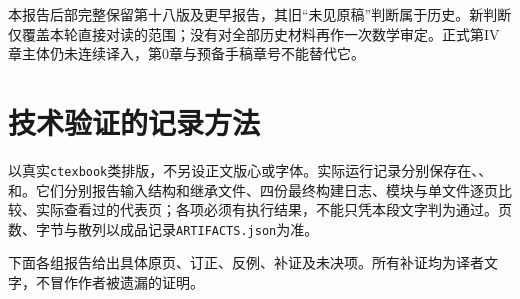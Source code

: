 本报告后部完整保留第十八版及更早报告，其旧“未见原稿”判断属于历史。新判断仅覆盖本轮直接对读的范围；没有对全部历史材料再作一次数学审定。正式第IV章主体仍未连续译入，第0章与预备手稿章号不能替代它。

\section*{技术验证的记录方法}
以真实\texttt{ctexbook}类排版，不另设正文版心或字体。实际运行记录分别保存在、、和。它们分别报告输入结构和继承文件、四份最终构建日志、模块与单文件逐页比较、实际查看过的代表页；各项必须有执行结果，不能只凭本段文字判为通过。页数、字节与散列以成品记录\texttt{ARTIFACTS.json}为准。

下面各组报告给出具体原页、订正、反例、补证及未决项。所有补证均为译者文字，不冒作作者被遗漏的证明。
